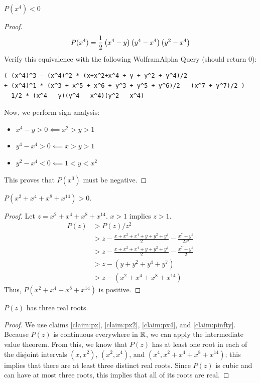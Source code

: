 \documentclass[10pt]{../usamts}
\begin{document}
\begin{solution}{4}
\begin{claim}
    $P(x^4) < 0$
    \label{claim:px4}
\end{claim}
\begin{proof}
    $$P(x^4) = \frac{1}{2} \left( x^4-y \right) \left( y^4 - x^4 \right)\left( y^2 - x^4 \right)$$ 
    Verify this equivalence with the following WolframAlpha Query (should return 0): 
    \begin{verbatim}
( (x^4)^3 - (x^4)^2 * (x+x^2+x^4 + y + y^2 + y^4)/2 
+ (x^4)^1 * (x^3 + x^5 + x^6 + y^3 + y^5 + y^6)/2 - (x^7 + y^7)/2 )
- 1/2 * (x^4 - y)(y^4 - x^4)(y^2 - x^4)
    \end{verbatim}
    Now, we perform sign analysis:
    \begin{itemize}
        \item $x^4 - y > 0 \impliedby x^2 > y > 1$
        \item $y^4 - x^4 > 0 \impliedby x > y > 1$
        \item $y^2 - x^4 < 0 \impliedby 1 < y < x^2$
    \end{itemize}
    This proves that $P(x^3)$ must be negative.
\end{proof}

\begin{claim}
    $P(x^2 + x^4 + x^8 + x^{14}) > 0$.
    \label{claim:pinfty}
\end{claim}
\begin{proof}
    Let $z = x^2 + x^4 + x^8 + x^{14}$. $x > 1$ implies $z > 1$.
    \begin{align*}
    P(z) &> P(z)/z^2 \\
         &> z - \frac{x+x^2+x^4+y+y^2+y^4}{2} - \frac{x^7+y^7}{2z^2} \\
         &> z - \frac{x+x^2+x^4+y+y^2+y^4}{2} - \frac{x^7+y^7}{2} \\
         &> z - (y + y^2 + y^4 + y^7) \\
         &> z - (x^2 + x^4 + x^8 + x^{14})
    \end{align*}
    Thus,  $P(x^2 + x^4 + x^8 + x^{14})$ is positive.
\end{proof}

\begin{claim}
    $P(z)$ has three real roots.
\end{claim}

\begin{proof}
    We use claims \ref{claim:px}, \ref{claim:px2}, \ref{claim:px4}, and \ref{claim:pinfty}.
    Because $P(z)$ is continuous everywhere in $\mathbb{R}$, we can apply the intermediate value theorem.
    From this, we know that $P(z)$ has at least one root in each of the disjoint intervals $(x, x^2)$, $(x^2, x^4)$, and $(x^4, x^2 + x^4 + x^8 + x^{14})$; this implies that there are at least three distinct real roots. Since $P(z)$ is cubic and can have at most three roots, this implies that all of its roots are real.
\end{proof}

\end{solution}
\end{document}
